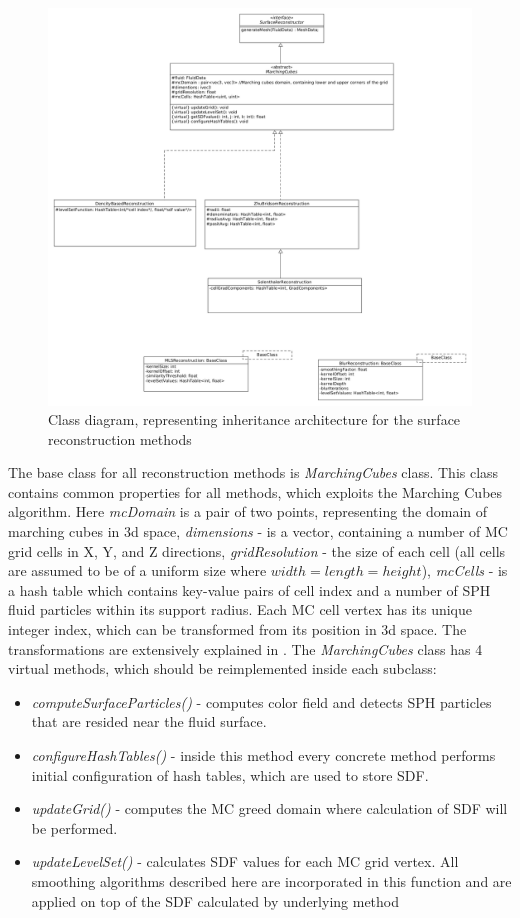\begin{figure}[H]
	\begin{center}
		\includegraphics[width=\textwidth]{figures/ClassDiagram.png}
	\end{center}
	\caption{Class diagram, representing inheritance architecture for the surface reconstruction methods}
    \label{fig:class-diagam}
\end{figure}
The base class for all reconstruction methods is \emph{MarchingCubes} class. This class contains common properties for all methods, which exploits the Marching Cubes algorithm. Here \emph{mcDomain} is a pair of two points, representing the domain of marching cubes in 3d space, \emph{dimensions} - is a vector, containing a number of MC grid cells in X, Y, and Z directions, \emph{gridResolution} - the size of each cell (all cells are assumed to be of a uniform size where $width=length=height$), \emph{mcCells} - is a hash table which contains key-value pairs of cell index and a number of SPH fluid particles within its support radius. Each MC cell vertex has its unique integer index, which can be transformed from its position in 3d space. The transformations are extensively explained in \cite{Akinchi}. 
The \emph{MarchingCubes} class has 4 virtual methods, which should be reimplemented inside each subclass:
\begin{itemize}
	\item \emph{computeSurfaceParticles()} - computes color field and detects SPH particles that are resided near the fluid surface.
	\item \emph{configureHashTables()} - inside this method every concrete method performs initial configuration of hash tables, which are used to store SDF.
	\item \emph{updateGrid()} - computes the MC greed domain where calculation of SDF will be performed.
	\item \emph{updateLevelSet()} - calculates SDF values for each MC grid vertex. All smoothing algorithms described here are incorporated in this function and are applied on top of the SDF calculated by underlying method 
\end{itemize}

